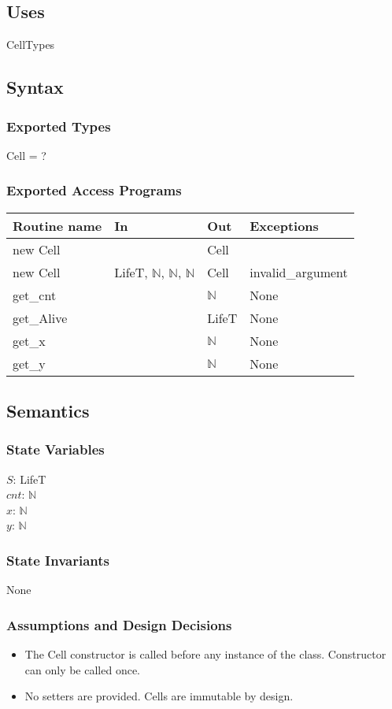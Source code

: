 \documentclass[]{article}
\begin{document}
\subsection*{Uses}
CellTypes

\subsection*{Syntax}
\subsubsection*{Exported Types}
Cell = ?
\subsubsection*{Exported Access Programs}
\begin{tabular}{| l | l | l | p{5cm} |}
\hline
\textbf{Routine name} & \textbf{In} & \textbf{Out} & \textbf{Exceptions}\\
\hline
new Cell &  & Cell & \\
\hline
new Cell & LifeT, $\mathbb{N}$, $\mathbb{N}$, $\mathbb{N}$ & Cell & invalid\_argument \\
\hline
get\_cnt & & $\mathbb{N}$ & None\\
\hline
get\_Alive & & LifeT & None \\
\hline
get\_x & & $\mathbb{N}$ & None\\
\hline
get\_y & & $\mathbb{N}$ & None\\
\hline
\end{tabular}

\subsection*{Semantics}
\subsubsection*{State Variables}
$S$: LifeT \\
$cnt$: $\mathbb{N}$ \\
$x$: $\mathbb{N}$ \\
$y$: $\mathbb{N}$ \\

\subsubsection*{State Invariants}
None

\subsubsection*{Assumptions and Design Decisions}
\begin{itemize}
\item The Cell constructor is called before any instance of the class. Constructor can only be called once.
\item No setters are provided. Cells are immutable by design.
\end{itemize}
\end{document}
